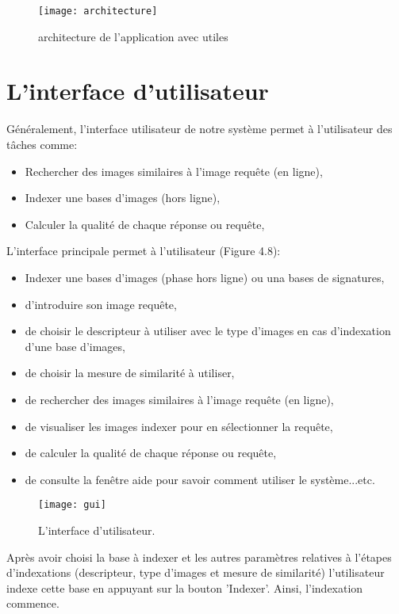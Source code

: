 \begin{figure}[H]
	\centering
	\texttt{[image: architecture]} 
	\caption{architecture de l’application avec utiles}
\end{figure}
\section{L’interface d’utilisateur }
Généralement, l'interface utilisateur de notre système permet à l'utilisateur des tâches comme:
 \begin{itemize}
 	\item Rechercher des images similaires à l'image requête (en ligne),
 	\item Indexer une bases d'images (hors ligne),
 	\item Calculer la qualité de chaque réponse ou requête,
 \end{itemize}

L'interface principale permet à l’utilisateur (Figure 4.8): 
\begin{itemize}
	\item Indexer une bases d'images (phase hors ligne) ou una bases de signatures,
	\item d’introduire son image requête,
	\item de choisir le descripteur à utiliser avec le type d'images en cas d'indexation d'une base d'images,
	\item de choisir la mesure de similarité à utiliser,
	\item de rechercher des images similaires à l'image requête (en ligne),
	\item de visualiser les images indexer pour en sélectionner la requête,
	\item de calculer la qualité de chaque réponse ou requête,
	\item de consulte la fenêtre aide pour savoir comment utiliser le système...etc.
\end{itemize}

\begin{figure}[H]
	\centering
	\texttt{[image: gui]} 
	\caption{L'interface d’utilisateur.}
\end{figure}
Après avoir choisi la base à indexer et les autres paramètres relatives à l'étapes d'indexations (descripteur, type d'images et mesure de similarité) l’utilisateur indexe cette base en appuyant sur la bouton 'Indexer'. Ainsi, l'indexation commence. \\\\

